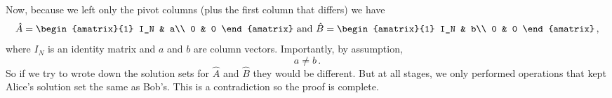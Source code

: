 {Now, because we left only the pivot columns (plus the first column that differs) we have
$$\hat{A}=\begin{amatrix}{1}
I_N & a\\
0 & 0
\end{amatrix} \mbox{ and } \hat{B}=\begin{amatrix}{1}
I_N & b\\
0 & 0
\end{amatrix}\, ,$$ where $I_N$ is an identity matrix and $a$ and $b$ are column vectors.
Importantly, by assumption,
$$
a\neq b\, .
$$
So if we try to wrote down the solution sets for $\widehat A$ and $\widehat B$ they would be different.
But at all stages, we only performed operations that kept Alice's solution set the same as Bob's.
This is a contradiction so the proof is complete.
} %

\newpage
